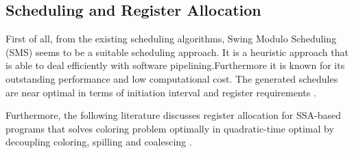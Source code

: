 \subsection{Scheduling and Register Allocation}
First of all, from the existing scheduling algorithms, Swing Modulo Scheduling (SMS) seems to be a suitable scheduling approach. It is a heuristic approach that is able to deal efficiently with software pipelining.Furthermore it is known for its outstanding performance and low computational cost. The generated schedules are near optimal in terms of initiation interval and register requirements \cite{swingmodulo_paper, swingmodulo_thesis}.

Furthermore, the following literature discusses register allocation for SSA-based programs that solves coloring problem optimally in quadratic-time optimal by decoupling coloring, spilling and coalescing \cite{ra}.